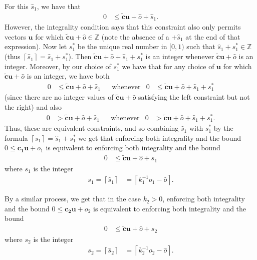\documentclass[11pt]{article}
\newcommand{\vect}[1]{\mathbf{#1}}
\newcommand{\ceil}[1]{{\left\lceil{#1}\right\rceil}}
\begin{document}
For this $\widehat{s}_1$, we have that
\begin{align*}
0 &\leq \widetilde{\vect{c}}\vect{u} + \widehat{o} + \widehat{s}_1.
\end{align*}
However, the integrality condition says that this constraint also only permits vectors $\vect{u}$ for which $\widetilde{\vect{c}}\vect{u} + \widehat{o}\in\mathbb{Z}$ (note the absence of a $+\widehat{s}_1$ at the end of that expression). Now let $s^*_1$ be the unique real number in $[0, 1)$ such that $\widehat{s}_1 + s^*_1 \in \mathbb{Z}$ (thus $\ceil{\widehat{s}_1} = \widehat{s}_1 + s^*_1$). Then $\widetilde{\vect{c}}\vect{u} + \widehat{o} + \widehat{s}_1 + s^*_1$ is an integer whenever $\widetilde{\vect{c}}\vect{u} + \widehat{o}$ is an integer. Moreover, by our choice of $s^*_1$ we have that for any choice of $\vect{u}$ for which $\widetilde{\vect{c}}\vect{u} + \widehat{o}$ is an integer, we have both
\begin{align*}
0&\leq \widetilde{\vect{c}}\vect{u} + \widehat{o} + \widehat{s}_1 & & \text{whenever} & 0&\leq \widetilde{\vect{c}}\vect{u} + \widehat{o} + \widehat{s}_1 + s^*_1
\end{align*}
(since there are no integer values of $\widetilde{\vect{c}}\vect{u} + \widehat{o}$ satisfying the left constraint but not the right) and also
\begin{align*}
0&> \widetilde{\vect{c}}\vect{u} + \widehat{o} + \widehat{s}_1 & & \text{whenever} & 0&> \widetilde{\vect{c}}\vect{u} + \widehat{o} + \widehat{s}_1 + s^*_1.
\end{align*}
Thus, these are equivalent constraints, and so combining $\widehat{s}_1$ with $s^*_1$ by the formula $\ceil{\widehat{s}_1} = \widehat{s}_1 + s^*_1$ we get that enforcing both integrality and the bound $0 \leq \vect{c_1}\vect{u} + o_1$ is equivalent to enforcing both integrality and the bound
\begin{align*}
0&\leq \widetilde{\vect{c}}\vect{u} + \widehat{o} + s_1
\end{align*}
where $s_1$ is the integer
\begin{align}
s_1 = \ceil{\widehat{s}_1} &= \ceil{k_1^{-1}o_1 - \widehat{o}}. \label{s1k+}
\end{align}

By a similar process, we get that in the case $k_2 > 0$, enforcing both integrality and the bound $0\leq \vect{c_2}\vect{u} + o_2$ is equivalent to enforcing both integrality and the bound
\begin{align*}
0&\leq \widetilde{\vect{c}}\vect{u} + \widehat{o} + s_2
\end{align*}
where $s_2$ is the integer
\begin{align}
s_2 = \ceil{\widehat{s}_2} &= \ceil{k_2^{-1}o_2 - \widehat{o}}. \label{s2k+}
\end{align}
\end{document}
